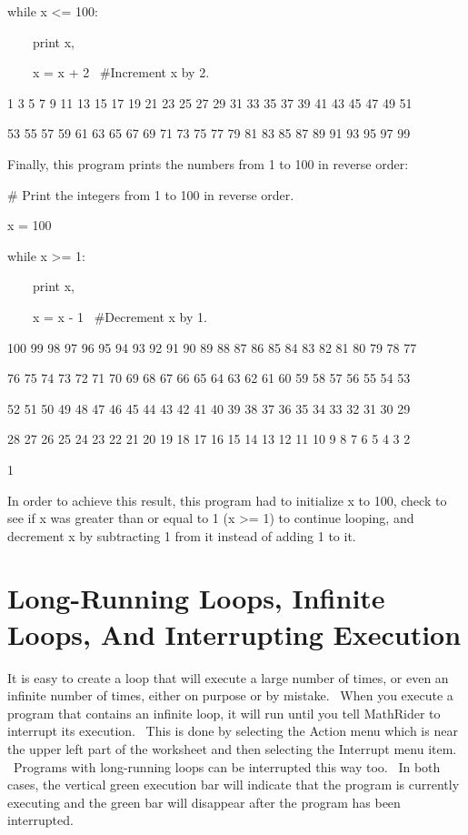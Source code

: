 \documentclass[12pt,twoside]{book}
\begin{document}
\bigskip

while x {\textless}= 100:

\ \ \ \ print x,

\ \ \ \ x = x + 2 \ \#Increment x by 2.

{\textbar}

1 3 5 7 9 11 13 15 17 19 21 23 25 27 29 31 33 35 37 39 41 43 45 47 49 51

53 55 57 59 61 63 65 67 69 71 73 75 77 79 81 83 85 87 89 91 93 95 97 99 

Finally, this program prints the numbers from 1 to 100 in reverse order:


\bigskip

\# Print the integers from 1 to 100 in reverse order.


\bigskip

x = 100 



while x {\textgreater}= 1:

\ \ \ \ print x,

\ \ \ \ x = x {}- 1 \ \#Decrement x by 1.

{\textbar}

100 99 98 97 96 95 94 93 92 91 90 89 88 87 86 85 84 83 82 81 80 79 78 77

76 75 74 73 72 71 70 69 68 67 66 65 64 63 62 61 60 59 58 57 56 55 54 53

52 51 50 49 48 47 46 45 44 43 42 41 40 39 38 37 36 35 34 33 32 31 30 29

28 27 26 25 24 23 22 21 20 19 18 17 16 15 14 13 12 11 10 9 8 7 6 5 4 3 2

1 


\bigskip

In order to achieve this result, this program had to initialize x to 100, check to see if x was greater than or equal to 1 (x {\textgreater}= 1) to continue looping, and decrement x by subtracting 1 from it instead of adding 1 to it.

\section[Long-Running Loops, Infinite Loops, And Interrupting Execution]{ Long-Running Loops, Infinite Loops, And Interrupting Execution}

It is easy to create a loop that will execute a large number of times, or even an infinite number of times, either on purpose or by mistake. \ When you execute a program that contains an infinite loop, it will run until you tell MathRider to interrupt its execution. \ This is done by selecting the Action menu which is near the upper left part of the worksheet and then selecting the Interrupt menu item. \ Programs with long{}-running loops can be interrupted this way too. \ In both cases, the vertical green execution bar will indicate that the program is currently executing and the green bar will disappear after the program has been interrupted. 
\end{document}
